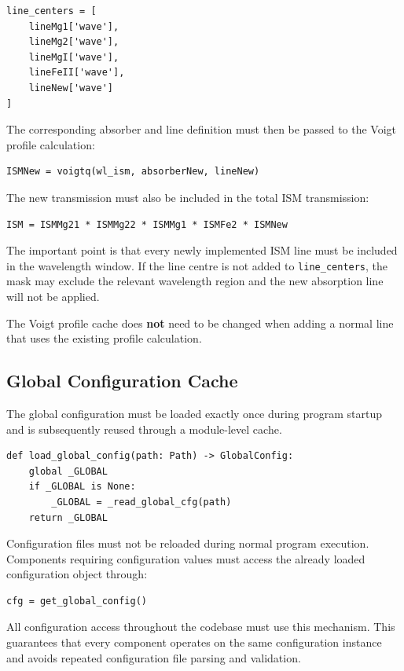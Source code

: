 \begin{verbatim}
line_centers = [
    lineMg1['wave'],
    lineMg2['wave'],
    lineMgI['wave'],
    lineFeII['wave'],
    lineNew['wave']
]
\end{verbatim}

The corresponding absorber and line definition must then be passed to the Voigt profile calculation:

\begin{verbatim}
ISMNew = voigtq(wl_ism, absorberNew, lineNew)
\end{verbatim}

The new transmission must also be included in the total ISM transmission:

\begin{verbatim}
ISM = ISMMg21 * ISMMg22 * ISMMg1 * ISMFe2 * ISMNew
\end{verbatim}

The important point is that every newly implemented ISM line must be included in the wavelength window. If the line centre is not added to \verb|line_centers|, the mask may exclude the relevant wavelength region and the new absorption line will not be applied.

The Voigt profile cache does \textbf{not} need to be changed when adding a normal line that uses the existing profile calculation.

\subsection{Global Configuration Cache}
\label{sec:global_config_cache}
The global configuration must be loaded exactly once during program startup and is subsequently reused through a module-level cache.

\begin{verbatim}
def load_global_config(path: Path) -> GlobalConfig:
    global _GLOBAL
    if _GLOBAL is None:
        _GLOBAL = _read_global_cfg(path)
    return _GLOBAL
\end{verbatim}

Configuration files must not be reloaded during normal program execution. Components requiring configuration values must access the already loaded configuration object through:

\begin{verbatim}
cfg = get_global_config()
\end{verbatim}

All configuration access throughout the codebase must use this mechanism. This guarantees that every component operates on the same configuration instance and avoids repeated configuration file parsing and validation.


